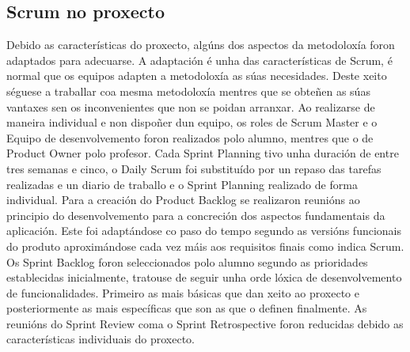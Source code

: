 \subsection{Scrum no proxecto}
Debido as características do proxecto, algúns dos aspectos da metodoloxía foron adaptados para adecuarse. A adaptación é unha das características de Scrum, é normal que os equipos adapten a metodoloxía as súas necesidades. Deste xeito séguese a traballar coa mesma metodoloxía mentres que se obteñen as súas vantaxes sen os inconvenientes que non se poidan arranxar.\smallbreak
Ao realizarse de maneira individual e non dispoñer dun equipo, os roles de Scrum Master e o Equipo de desenvolvemento foron realizados polo alumno, mentres que o de Product Owner polo profesor.\smallbreak
Cada Sprint Planning tivo unha duración de entre tres semanas e cinco, o Daily Scrum foi substituído por un repaso das tarefas realizadas e un diario de traballo e o Sprint Planning realizado de forma individual.\smallbreak
Para a creación do Product Backlog se realizaron reunións ao principio do desenvolvemento para a concreción dos aspectos fundamentais da aplicación. Este foi adaptándose co paso do tempo segundo as versións funcionais do produto aproximándose cada vez máis aos requisitos finais como indica Scrum.\smallbreak
Os Sprint Backlog foron seleccionados polo alumno segundo as prioridades establecidas inicialmente, tratouse de seguir unha orde lóxica de desenvolvemento de funcionalidades. Primeiro as mais básicas que dan xeito ao proxecto e posteriormente as mais específicas que son as que o definen finalmente.\smallbreak
As reunións do Sprint Review coma o Sprint Retrospective foron reducidas debido as características individuais do proxecto.

